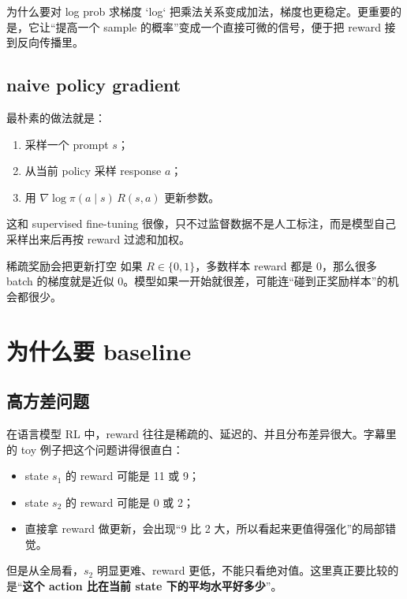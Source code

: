 \documentclass[a4paper]{article}
\begin{document}
\begin{knowledgebox}{为什么要对 log prob 求梯度}
`log` 把乘法关系变成加法，梯度也更稳定。更重要的是，它让“提高一个 sample 的概率”变成一个直接可微的信号，便于把 reward 接到反向传播里。
\end{knowledgebox}


\subsection{naive policy gradient}

最朴素的做法就是：
\begin{enumerate}
    \item 采样一个 prompt $s$；
    \item 从当前 policy 采样 response $a$；
    \item 用 $\nabla \log \pi(a \mid s)\,R(s,a)$ 更新参数。
\end{enumerate}

这和 supervised fine-tuning 很像，只不过监督数据不是人工标注，而是模型自己采样出来后再按 reward 过滤和加权。

\begin{warningbox}{稀疏奖励会把更新打空}
如果 $R \in \{0,1\}$，多数样本 reward 都是 0，那么很多 batch 的梯度就是近似 0。模型如果一开始就很差，可能连“碰到正奖励样本”的机会都很少。
\end{warningbox}


\section{为什么要 baseline}

\subsection{高方差问题}

在语言模型 RL 中，reward 往往是稀疏的、延迟的、并且分布差异很大。字幕里的 toy 例子把这个问题讲得很直白：

\begin{itemize}
    \item state $s_1$ 的 reward 可能是 11 或 9；
    \item state $s_2$ 的 reward 可能是 0 或 2；
    \item 直接拿 reward 做更新，会出现“9 比 2 大，所以看起来更值得强化”的局部错觉。
\end{itemize}

但是从全局看，$s_2$ 明显更难、reward 更低，不能只看绝对值。这里真正要比较的是“\textbf{这个 action 比在当前 state 下的平均水平好多少}”。
\end{document}
